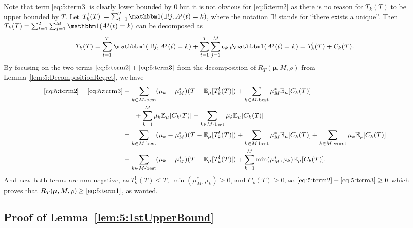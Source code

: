   Note that term \ref{eq:5:term3} is clearly lower bounded by $0$
  but it is not obvious for \ref{eq:5:term2} as there is no reason for $T_k(T)$ to be upper bounded by $T$.
  Let $T_k^{!}(T) := \sum_{t=1}^{T} \indic(\exists! j, A^j(t)=k)$,
  where the notation $\exists!$ stands for ``there exists a unique''.
  Then $T_k(T) = \sum_{t=1}^{T} \sum_{j=1}^{M} \indic(A^j(t) = k)$ can be decomposed as
  \begin{equation*}
    T_k(T) = \sum_{t=1}^{T} \indic(\exists! j, A^j(t) = k) + \sum_{t=1}^{T} \sum_{j=1}^{M} c_{k,t} \indic(A^j(t) = k)
    = T_k^{!}(T) + C_k(T).
  \end{equation*}
  By focusing on the two terms $\ref{eq:5:term2} + \ref{eq:5:term3}$ from the decomposition of $R_T(\boldsymbol{\mu}, M, \rho)$ from Lemma~\ref{lem:5:DecompositionRegret}, we have
  \begin{align*}
    \ref{eq:5:term2} + \ref{eq:5:term3} &=
    \sum_{k \in M\text{-}\mathrm{best}} (\mu_k - \mu_M^*) (T - \mathbb{E}_{\mu}[T_k^!(T)])
    + \sum_{k \in M\text{-}\mathrm{best}} \mu_M^* \mathbb{E}_{\mu}[C_k(T)] \\
    & \;\;\;\;\;\; + \sum_{k=1}^{M} \mu_k \mathbb{E}_{\mu}[C_k(T)]
    - \sum_{k \in M\text{-}\mathrm{best}} \mu_k \mathbb{E}_{\mu}[C_k(T)] \\
    &=
    \sum_{k \in M\text{-}\mathrm{best}} (\mu_k - \mu_M^*) (T - \mathbb{E}_{\mu}[T_k^!(T)])
    + \sum_{k \in M\text{-}\mathrm{best}} \mu_M^* \mathbb{E}_{\mu}[C_k(T)]
    + \sum_{k \in M\text{-}\mathrm{worst}} \mu_k \mathbb{E}_{\mu}[C_k(T)] \\
    &=
    \sum_{k \in M\text{-}\mathrm{best}} (\mu_k - \mu_M^*) (T - \mathbb{E}_{\mu}[T_k^!(T)])
    + \sum_{k=1}^{M} \min(\mu_M^*, \mu_k) \mathbb{E}_{\mu}[C_k(T)].
  \end{align*}
  And now both terms are non-negative, as $T_k^!(T) \leq T$, $\min(\mu_M^*, \mu_k)\geq 0$, and $C_k(T) \geq 0$, so $\ref{eq:5:term2} + \ref{eq:5:term3} \geq 0$
  which proves that $R_T(\boldsymbol{\mu}, M, \rho) \geq \ref{eq:5:term1}$, as wanted.


\subsection{Proof of Lemma~\ref{lem:5:1stUpperBound}}
\label{proof:5:1stUpperBound}

